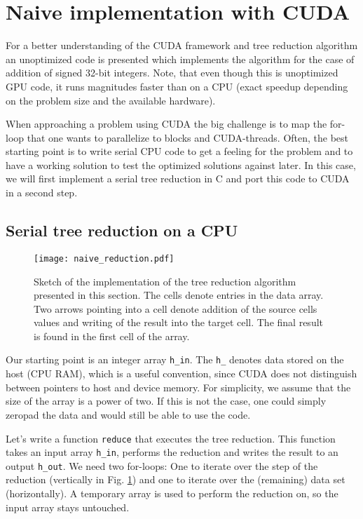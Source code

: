 \section{Naive implementation with CUDA}
For a better understanding of the CUDA framework and tree reduction algorithm an unoptimized code is presented which implements the algorithm for the case of addition of signed 32-bit integers. 
Note, that even though this is unoptimized GPU code, it runs magnitudes faster than on a CPU (exact speedup depending on the problem size and the available hardware).

When approaching a problem using CUDA the big challenge is to map the for-loop that one wants to parallelize to blocks and CUDA-threads. 
Often, the best starting point is to write serial CPU code to get a feeling for the problem and to have a working solution to test the optimized solutions against later.
In this case, we will first implement a serial tree reduction in C and port this code to CUDA in a second step.

\subsection{Serial tree reduction on a CPU}
\begin{figure} \label{fig_naive_reduction}
    \centering
    \texttt{[image: naive\_reduction.pdf]}
    \caption{
        Sketch of the implementation of the tree reduction algorithm presented in this section.
        The cells denote entries in the data array.
        Two arrows pointing into a cell denote addition of the source cells values and writing of the result into the target cell.
        The final result is found in the first cell of the array.
    }
\end{figure}
Our starting point is an integer array \texttt{h\_in}.
The \texttt{h\_} denotes data stored on the host (CPU RAM), which is a useful convention, since CUDA does not distinguish between pointers to host and device memory.
For simplicity, we assume that the size of the array is a power of two.
If this is not the case, one could simply zeropad the data and would still be able to use the code.

Let's write a function \texttt{reduce} that executes the tree reduction.
This function takes an input array \texttt{h\_in}, performs the reduction and writes the result to an output \texttt{h\_out}. 
We need two for-loops:
One to iterate over the step of the reduction (vertically in Fig. \ref{fig_naive_reduction}) and one to iterate over the (remaining) data set (horizontally). 
A temporary array is used to perform the reduction on, so the input array stays untouched.

